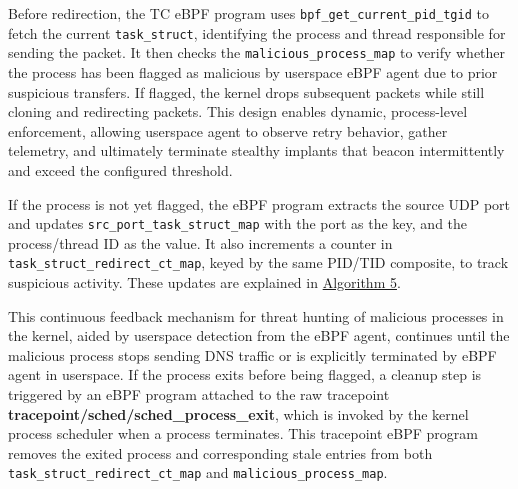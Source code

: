 \documentclass [11pt, proquest] {uwthesis}[2020/02/24]
\begin{document}
Before redirection, the TC eBPF program uses \texttt{bpf\_get\_current\_pid\_tgid} to fetch the current \texttt{task\_struct}, identifying the process and thread responsible for sending the packet. It then checks the \texttt{malicious\_process\_map} to verify whether the process has been flagged as malicious by userspace eBPF agent due to prior suspicious transfers. If flagged, the kernel drops subsequent packets while still cloning and redirecting packets. This design enables dynamic, process-level enforcement, allowing userspace agent to observe retry behavior, gather telemetry, and ultimately terminate stealthy implants that beacon intermittently and exceed the configured threshold.

If the process is not yet flagged, the eBPF program extracts the source UDP port and updates \texttt{src\_port\_task\_struct\_map} with the port as the key, and the process/thread ID as the value. It also increments a counter in \texttt{task\_struct\_redirect\_ct\_map}, keyed by the same PID/TID composite, to track suspicious activity. These updates are explained in \hyperref[sec:alg5]{Algorithm 5}.

This continuous feedback mechanism for threat hunting of malicious processes in the kernel, aided by userspace detection from the eBPF agent, continues until the malicious process stops sending DNS traffic or is explicitly terminated by eBPF agent in userspace. If the process exits before being flagged, a cleanup step is triggered by an eBPF program attached to the raw tracepoint \textbf{tracepoint/sched/sched\_process\_exit}, which is invoked by the kernel process scheduler when a process terminates. This tracepoint eBPF program removes the exited process and corresponding stale entries from both \texttt{task\_struct\_redirect\_ct\_map} and \texttt{malicious\_process\_map}.

\end{document}
